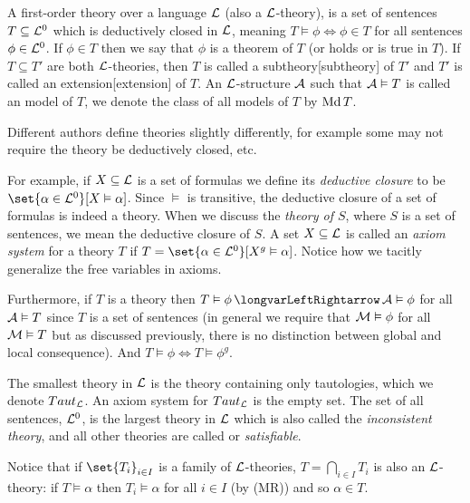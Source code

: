     A {\emphcolor first-order theory} over a language ${\cal L}$ (also a {\emphcolor ${\cal L}$-theory}), is a set of sentences $T\subseteq{\cal L}^0$ which is
    {\emphcolor deductively closed} in ${\cal L}$, meaning $T\vDash\phi\iff\phi\in T$ for all sentences $\phi\in{\cal L}^0$.
    If $\phi\in T$ then we say that $\phi$ is a {\emphcolor theorem} of $T$ (or holds or is true in $T$).
    If $T\subseteq T'$ are both ${\cal L}$-theories, then $T$ is called a {\emphcolor subtheory}[subtheory] of $T'$ and $T'$ is called an
    {\emphcolor extension}[extension] of $T$.
    An ${\cal L}$-structure ${\cal A}$ such that ${\cal A}\vDash T$ is called an {\emphcolor model} of $T$, we denote the class of all models of $T$ by $\mathop{\rm Md} T$.

\edefn

Different authors define theories slightly differently, for example some may not require the theory be deductively closed, etc.

For example, if $X\subseteq{\cal L}$ is a set of formulas we define its {\it deductive closure} to be $\set{\alpha\in{\cal L}^0}[X\vDash\alpha]$.
Since $\vDash$ is transitive, the deductive closure of a set of formulas is indeed a theory.
When we discuss the {\it theory of $S$}, where $S$ is a set of sentences, we mean the deductive closure of $S$.
A set $X\subseteq{\cal L}$ is called an {\it axiom system} for a theory $T$ if $T=\set{\alpha\in{\cal L}^0}[X^g\vDash\alpha]$.
Notice how we tacitly generalize the free variables in axioms.

Furthermore, if $T$ is a theory then $T\vDash\phi\iff{\cal A}\vDash\phi$ for all ${\cal A}\vDash T$ since $T$ is a set of sentences (in general we require that ${\cal M}\vDash\phi$ for all ${\cal M}\vDash T$
but as discussed previously, there is no distinction between global and local consequence).
And $T\vDash\phi\iff T\vDash\phi^g$.

The smallest theory in ${\cal L}$ is the theory containing only tautologies, which we denote ${\sl Taut}_{\cal L}$.
An axiom system for ${\sl Taut}_{\cal L}$ is the empty set.
The set of all sentences, ${\cal L}^0$, is the largest theory in ${\cal L}$ which is also called the {\it inconsistent theory}, and all other theories are called or {\it satisfiable}.

Notice that if $\set{T_i}_{i\in I}$ is a family of ${\cal L}$-theories, $T=\bigcap_{i\in I}T_i$ is also an ${\cal L}$-theory: if $T\vDash\alpha$ then $T_i\vDash\alpha$ for all $i\in I$ (by (MR)) and so
$\alpha\in T$.

